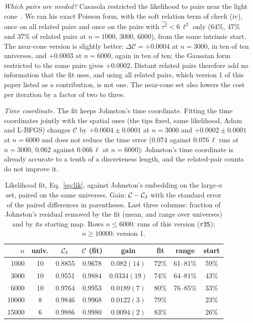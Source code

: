 \documentclass[prd,twocolumn,superscriptaddress,nofootinbib,amsmath,amssymb,floatfix]{revtex4-2}
\begin{document}
\emph{Which pairs are needed?} Casasola restricted the likelihood to pairs near the light cone~\cite{Casasola26}. We ran his exact Poisson form, with the soft relation term of check (iv), once on all related pairs and once on the pairs with $\widehat{\tau^2}<6\,\ell^2$ only ($64\%$, $47\%$ and $37\%$ of related pairs at $n=1000$, $3000$, $6000$), from the same intrinsic start. The near-cone version is slightly better: $\Delta\mathcal C=+0.0004$ at $n=3000$, in ten of ten universes, and $+0.0003$ at $n=6000$, again in ten of ten; the Gaussian form restricted to the same pairs gives $+0.0002$. Distant related pairs therefore add no information that the fit uses, and using all related pairs, which version 1 of this paper listed as a contribution, is not one. The near-cone set also lowers the cost per iteration by a factor of two to three.

\emph{Time coordinate.} The fit keeps Johnston's time coordinate. Fitting the time coordinates jointly with the spatial ones (the tips fixed, same likelihood, Adam and L-BFGS) changes $\mathcal C$ by $+0.0004\pm0.0001$ at $n=3000$ and $+0.0002\pm0.0001$ at $n=6000$ and does not reduce the time error ($0.074$ against $0.076\,\ell$ rms at $n=3000$, $0.062$ against $0.066\,\ell$ at $n=6000$): Johnston's time coordinate is already accurate to a tenth of a discreteness length, and the related-pair counts do not improve it.

\begin{table}[t]
\caption{Likelihood fit, Eq.~\eqref{eq:lik}, against Johnston's embedding on the large-$n$ set, paired on the same universes. Gain: $\mathcal C-\mathcal C_{\rm J}$ with the standard error of the paired differences in parentheses. Last three columns: fraction of Johnston's residual removed by the fit (mean, and range over universes) and by its starting map. Rows $n\le6000$: runs of this version (\texttt{r35}); $n\ge10000$: version 1.}
\label{tab:lik}
\begin{ruledtabular}
\begin{tabular}{rccccccc}
$n$ & univ. & $\mathcal C_{\rm J}$ & $\mathcal C$ (fit) & gain & fit & range & start\\
\hline
1000 & 10 & 0.8855 & 0.9678 & $0.082(14)$ & 72\% & 61--81\% & 59\%\\
3000 & 10 & 0.9551 & 0.9884 & $0.0334(19)$ & 74\% & 64--81\% & 43\%\\
6000 & 10 & 0.9764 & 0.9953 & $0.0189(7)$ & 80\% & 76--85\% & 33\%\\
10000 & 8 & 0.9846 & 0.9968 & $0.0122(3)$ & 79\% & & 23\%\\
15000 & 6 & 0.9886 & 0.9980 & $0.0094(2)$ & 83\% & & 26\%\\
\end{tabular}
\end{ruledtabular}
\end{table}
\end{document}
